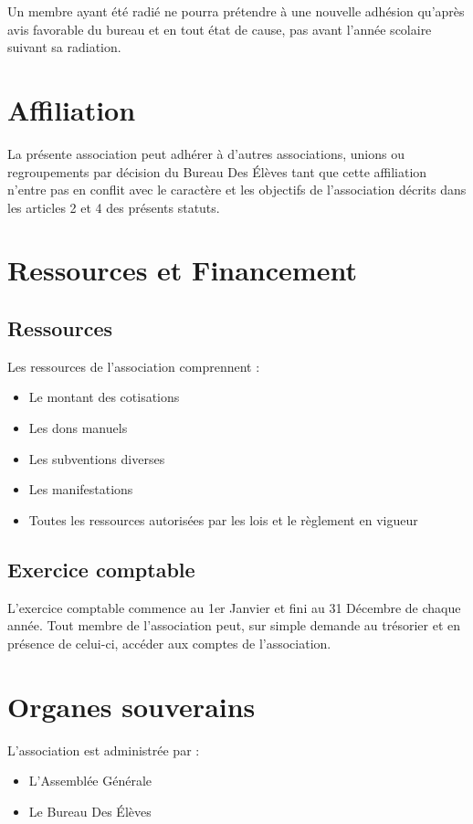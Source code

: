 \documentclass{article} %
\begin{document}
			Un membre ayant été radié ne pourra prétendre à une nouvelle adhésion
			qu’après avis favorable du bureau et en tout état de cause, pas avant
			l’année scolaire suivant sa radiation.

	\section{Affiliation}
		La présente association peut adhérer à d’autres associations, unions ou
		regroupements par décision du Bureau Des Élèves tant que cette affiliation
		n’entre pas en conflit avec le caractère et les objectifs de l’association
		décrits dans les articles 2 et 4 des présents statuts.

	\section{Ressources et Financement}
		\subsection{Ressources}
			Les ressources de l’association comprennent :
			\begin{itemize}
				\item Le montant des cotisations
				\item Les dons manuels
				\item Les subventions diverses
				\item Les manifestations
				\item Toutes les ressources autorisées par les lois et le règlement
			        en vigueur
			\end{itemize}

		\subsection{Exercice comptable}
			L’exercice comptable commence au 1er Janvier et fini au 31 Décembre de
			chaque année. Tout membre de l’association peut, sur simple demande au
			trésorier et en présence de celui-ci, accéder aux comptes de
			l’association.

	\section{Organes souverains}
		L’association est administrée par :
		\begin{itemize}
			\item L’Assemblée Générale
			\item Le Bureau Des Élèves
		\end{itemize}
\end{document}
